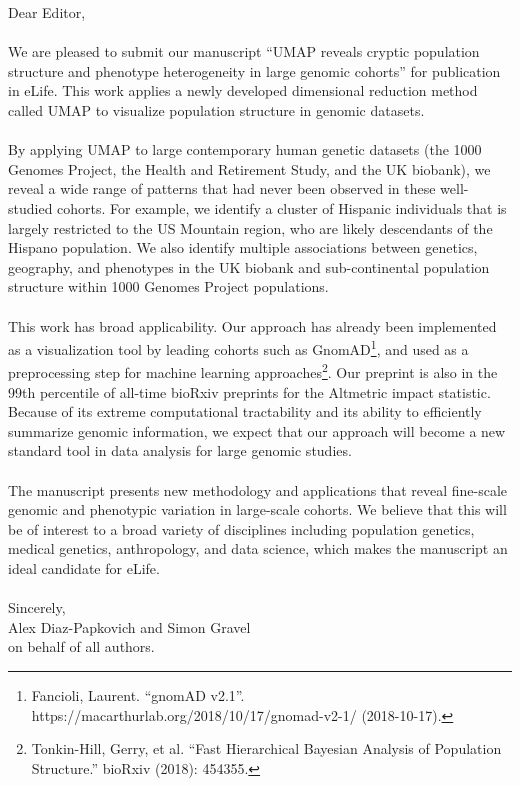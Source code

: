 \documentclass{article}
\begin{document}
Dear Editor,
\\\\
We are pleased to submit our manuscript ``UMAP reveals cryptic population structure and phenotype heterogeneity in large genomic cohorts'' for publication in eLife. This work applies a newly developed dimensional reduction method called UMAP to visualize population structure in genomic datasets.
\\\\
By applying UMAP to large contemporary human genetic datasets (the 1000 Genomes Project, the Health and Retirement Study, and the UK biobank), we reveal a wide range of patterns that had never been observed in these well-studied cohorts. For example, we identify a cluster of Hispanic individuals that is largely restricted to the US Mountain region, who are likely descendants of the Hispano population. We also identify multiple associations between genetics, geography, and phenotypes in the UK biobank and sub-continental population structure within 1000 Genomes Project populations.
\\\\
This work has broad applicability. Our approach has already been implemented as a visualization tool by leading cohorts such as GnomAD\footnote{Fancioli, Laurent. ``gnomAD v2.1''. https://macarthurlab.org/2018/10/17/gnomad-v2-1/ (2018-10-17).}, and used as a preprocessing step for machine learning approaches\footnote{Tonkin-Hill, Gerry, et al. ``Fast Hierarchical Bayesian Analysis of Population Structure.'' bioRxiv (2018): 454355.}. Our preprint is also in the 99th percentile of all-time bioRxiv preprints for the Altmetric impact statistic. Because of its extreme computational tractability and its ability to efficiently summarize genomic information, we expect that our approach will become a new standard tool in data analysis for large genomic studies. 
\\\\
The manuscript presents new methodology and applications that reveal fine-scale genomic and phenotypic variation in large-scale cohorts.  We believe that this will be of interest to a broad variety of disciplines including population genetics, medical genetics, anthropology, and data science, which makes the manuscript an ideal candidate for eLife.
\\
\\
Sincerely,
\\
Alex Diaz-Papkovich and Simon Gravel
\\
on behalf of all authors.
\end{document}
